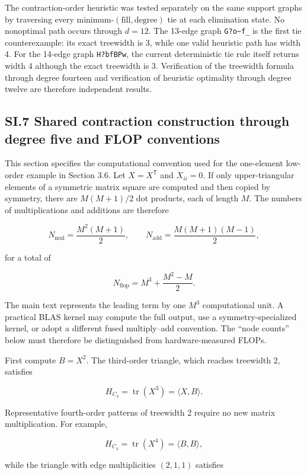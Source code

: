 The contraction-order heuristic was tested separately on the same support graphs by traversing every minimum-\((\mathrm{fill},\mathrm{degree})\) tie at each elimination state. No nonoptimal path occurs through \(d=12\). The 13-edge graph \texttt{G?o\textasciitilde{}f\_} is the first tie counterexample: its exact treewidth is 3, while one valid heuristic path has width 4. For the 14-edge graph \texttt{H?bfBPw}, the current deterministic tie rule itself returns width 4 although the exact treewidth is 3. Verification of the treewidth formula through degree fourteen and verification of heuristic optimality through degree twelve are therefore independent results.

\subsection{SI.7 Shared contraction construction through degree five and FLOP conventions}\label{sec:si-flops}

This section specifies the computational convention used for the one-element low-order example in Section 3.6. Let \(X=X^{\mathsf T}\) and \(X_{ii}=0\). If only upper-triangular elements of a symmetric matrix square are computed and then copied by symmetry, there are \(M(M+1)/2\) dot products, each of length \(M\). The numbers of multiplications and additions are therefore

\[
N_{\mathrm{mul}}
=\frac{M^2(M+1)}{2},
\qquad
N_{\mathrm{add}}
=\frac{M(M+1)(M-1)}{2},
\]

for a total of

\[
N_{\mathrm{flop}}
=M^3+\frac{M^2-M}{2}.
\]

The main text represents the leading term by one \(M^3\) computational unit. A practical BLAS kernel may compute the full output, use a symmetry-specialized kernel, or adopt a different fused multiply--add convention. The ``node counts'' below must therefore be distinguished from hardware-measured FLOPs.

First compute \(B=X^2\). The third-order triangle, which reaches treewidth 2, satisfies

\[
H_{C_3}=\operatorname{tr}(X^3)=\langle X,B\rangle.
\]

Representative fourth-order patterns of treewidth 2 require no new matrix multiplication. For example,

\[
H_{C_4}=\operatorname{tr}(X^4)=\langle B,B\rangle,
\]

while the triangle with edge multiplicities \((2,1,1)\) satisfies


